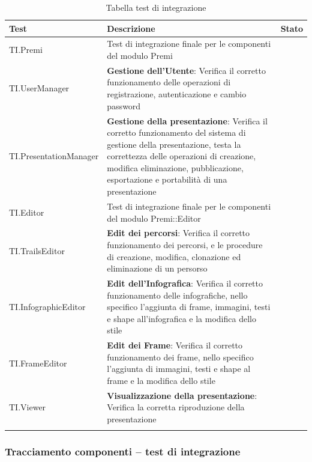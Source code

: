 \begin{longtable}{|p{4.5cm}|p{7cm}|p{2.5cm}|}
	\hline
	\textbf{Test} & \textbf{Descrizione} & \textbf{Stato} \\
	\hline
	TI.Premi & Test di integrazione finale per le componenti del modulo Premi & \teststatus \\
	\hline
	TI.UserManager & \textbf{Gestione dell'Utente}: Verifica il corretto funzionamento delle operazioni di registrazione, autenticazione e cambio password & \teststatus \\
	\hline
	TI.PresentationManager & \textbf{Gestione della presentazione}: Verifica il corretto funzionamento del sistema di gestione della presentazione, testa la correttezza delle operazioni di creazione, modifica eliminazione, pubblicazione, esportazione e portabilità di una presentazione& \teststatus \\
	\hline
	TI.Editor & Test di integrazione finale per le componenti del modulo Premi::Editor & \teststatus \\
	\hline
	TI.TrailsEditor & \textbf{Edit dei percorsi}: Verifica il corretto funzionamento dei percorsi, e le procedure di creazione, modifica, clonazione ed eliminazione di un persorso & \teststatus \\
	\hline
	TI.InfographicEditor & \textbf{Edit dell'Infografica}: Verifica il corretto funzionamento delle infografiche, nello specifico l'aggiunta di frame, immagini, testi e shape all'infografica e la modifica dello stile& \teststatus \\
	\hline
	TI.FrameEditor & \textbf{Edit dei Frame}: Verifica il corretto funzionamento dei frame, nello specifico l'aggiunta di immagini, testi e shape al frame e la modifica dello stile & \teststatus \\
	\hline
	TI.Viewer & \textbf{Visualizzazione della presentazione}: Verifica la corretta riproduzione della presentazione& \teststatus \\
	\hline
	\caption{Tabella test di integrazione}
\end{longtable}

\subsubsection{Tracciamento componenti – test di integrazione}


